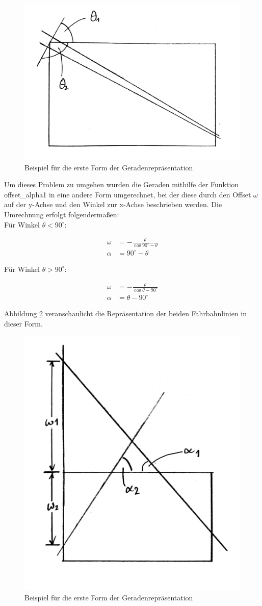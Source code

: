 	
	
	\begin{figure}[H]
		\centering
		\includegraphics[width=.5\linewidth]{images/rho_theta2.jpg}
		\caption{Beispiel für die erste Form der Geradenrepräsentation}
		\label{fig:rho_theta2}
	\end{figure}

	Um dieses Problem zu umgehen wurden die Geraden mithilfe der Funktion offset\_alpha1 in eine andere Form umgerechnet, bei der diese durch den Offset $\omega$ auf der y-Achse und den Winkel zur x-Achse beschrieben werden. Die Umrechnung erfolgt folgendermaßen:\\
	
	Für Winkel $\theta<90^\circ$:
	
	\begin{align*}
		\omega&=-\frac{\rho}{\cos{90^{\circ}-\theta}} \\
		\alpha&=90^{\circ}-\theta
	\end{align*}
	
	Für Winkel $\theta>90^\circ$:
	
	\begin{align*}
		\omega&=-\frac{\rho}{\cos{\theta-90^{\circ}}} \\
		\alpha&=\theta-90^{\circ}
	\end{align*}
	
	Abbildung \ref{fig:alpha_omega1} veranschaulicht die Repräsentation der beiden Fahrbahnlinien in dieser Form.
	
	\begin{figure}[H]
		\centering
		\includegraphics[width=.5\linewidth]{images/alpha_omega1.jpg}
		\caption{Beispiel für die erste Form der Geradenrepräsentation}
		\label{fig:alpha_omega1}
	\end{figure}

